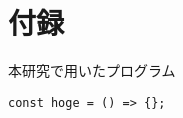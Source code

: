 \chapter*{付録}
\thispagestyle{fancy}

本研究で用いたプログラム

\begin{lstlisting}
const hoge = () => {};
\end{lstlisting}
